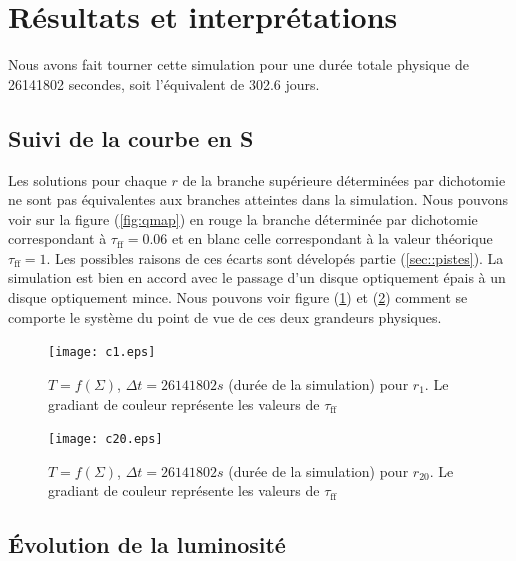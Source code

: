 \section{Résultats et interprétations}

Nous avons fait tourner cette simulation pour une durée totale physique de 26141802 secondes, soit l'équivalent de 302.6 jours. 

\subsection{Suivi de la courbe en S}
Les solutions pour chaque $r$ de la branche supérieure déterminées par dichotomie ne sont pas équivalentes aux branches atteintes dans la simulation. Nous pouvons voir sur la figure (\ref{fig:qmap}) en rouge la branche déterminée par dichotomie correspondant à $\tau_\mathrm{ff} = 0.06 $ et en blanc celle correspondant à la valeur théorique $\tau_\mathrm{ff} = 1$. Les possibles raisons de ces écarts sont dévelopés partie (\ref{sec::pistes}). La simulation est bien en accord avec le passage d'un disque optiquement épais à un disque optiquement mince. Nous pouvons voir figure (\ref{fig:c1.eps}) et (\ref{fig:c20.eps}) comment se comporte le système du point de vue de ces deux grandeurs physiques.  \\
 

\begin{figure}
  \begin{center}
    \texttt{[image: c1.eps]}
  \end{center}
  \caption{$T=f(\Sigma)$, $\Delta t = 26141802 s$ (durée de la simulation) pour $r_{1}$. Le gradiant de couleur représente les valeurs de $\tau_\mathrm{ff}$}
  \label{fig:c1.eps}
\end{figure} 

\begin{figure}
  \begin{center}
    \texttt{[image: c20.eps]}
  \end{center}
  \caption{$T=f(\Sigma)$, $\Delta t = 26141802 s$ (durée de la simulation) pour $r_{20}$. Le gradiant de couleur représente les valeurs de $\tau_\mathrm{ff}$}
  \label{fig:c20.eps}
\end{figure}

\subsection{Évolution de la luminosité}

